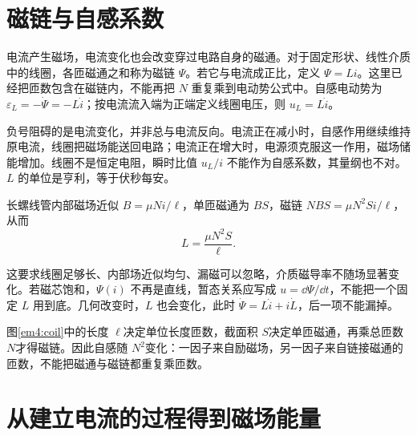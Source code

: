 \section{磁链与自感系数}

电流产生磁场，电流变化也会改变穿过电路自身的磁通。对于固定形状、线性介质中的线圈，各匝磁通之和称为磁链 $\Psi$。若它与电流成正比，定义 $\Psi=Li$。这里已经把匝数包含在磁链内，不能再把 $N$ 重复乘到电动势公式中。自感电动势为 $\varepsilon_L=-\dot\Psi=-L\dot i$；按电流流入端为正端定义线圈电压，则 $u_L=L\dot i$。

负号阻碍的是电流变化，并非总与电流反向。电流正在减小时，自感作用继续维持原电流，线圈把磁场能送回电路；电流正在增大时，电源须克服这一作用，磁场储能增加。线圈不是恒定电阻，瞬时比值 $u_L/i$ 不能作为自感系数，其量纲也不对。$L$ 的单位是亨利，等于伏秒每安。

长螺线管内部磁场近似 $B=\mu Ni/\ell$，单匝磁通为 $BS$，磁链 $NBS=\mu N^2Si/\ell$，从而
\begin{equation}L=\frac{\mu N^2S}{\ell}.\label{em4:solenoid}\end{equation}

这要求线圈足够长、内部场近似均匀、漏磁可以忽略，介质磁导率不随场显著变化。若磁芯饱和，$\Psi(i)$ 不再是直线，暂态关系应写成 $u=\dd\Psi/\dd t$，不能把一个固定 $L$ 用到底。几何改变时，$L$ 也会变化，此时 $\dot\Psi=L\dot i+i\dot L$，后一项不能漏掉。



图\ref{em4:coil}中的长度 $\ell$决定单位长度匝数，截面积 $S$决定单匝磁通，再乘总匝数 $N$才得磁链。因此自感随 $N^2$变化：一因子来自励磁场，另一因子来自链接磁通的匝数，不能把磁通与磁链都重复乘匝数。


\section{从建立电流的过程得到磁场能量}

